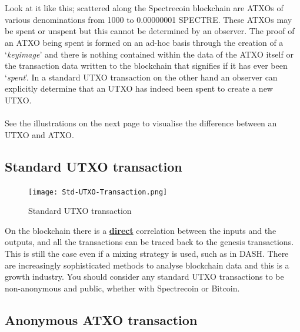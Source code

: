 \\
\\
\noindent
Look at it like this; scattered along the Spectrecoin blockchain are ATXOs of
various denominations from 1000 to 0.00000001 SPECTRE. These ATXOs may be spent
or unspent but this cannot be determined by an observer. The proof of an ATXO
being spent is formed on an ad-hoc basis through the creation of a ‘\textit{keyimage}’
and there is nothing contained within the data of the ATXO itself or the
transaction data written to the blockchain that signifies if it has ever been
‘\textit{spent}’. In a standard UTXO transaction on the other hand an observer can
explicitly determine that an UTXO has indeed been spent to create a new UTXO.
\\
\\
\noindent
See the illustrations on the next page to visualise the difference between an
UTXO and ATXO.
\newpage



\subsection{Standard UTXO transaction}

\begin{figure}[ht]
	\centering
	\texttt{[image: Std-UTXO-Transaction.png]}
	\caption{Standard UTXO transaction}
\end{figure}

\noindent
On the blockchain there is a \textbf{\underline{direct}} correlation
between the inputs and the outputs, and all the transactions can be 
traced back to the genesis transactions. This is still the case even 
if a mixing strategy is used, such as in DASH. There are increasingly 
sophisticated methods to analyse blockchain data and this is a growth 
industry. You should consider any standard UTXO transactions to be 
non-anonymous and public, whether with Spectrecoin or Bitcoin.



\subsection{Anonymous ATXO transaction}

